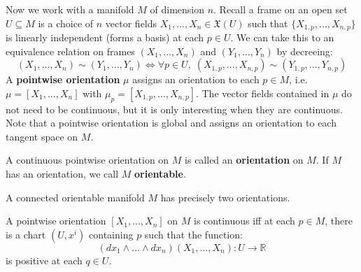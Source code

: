 Now we work with a manifold $M$ of dimension $n$. Recall a frame on an open set $U\subseteq M$ is a choice of $n$
vector fields $X_1, ..., X_n\in\mathfrak X(U)$ such that $\{X_{1, p}, ..., X_{n, p}\}$ is linearly independent (forms a basis) 
at each $p\in U$. We can take this to an equivalence relation on frames $(X_1, ..., X_n)$ and $(Y_1, ..., Y_n)$ by decreeing:
\begin{equation}
	(X_1, ..., X_n)\sim (Y_1, ..., Y_n)\iff \forall p\in U, \;(X_{1, p}, ..., X_{n, p})\sim (Y_{1, p}, ..., Y_{n, p})
\end{equation}
A \textbf{pointwise orientation} $\mu$ assigns an orientation to each $p\in M$, i.e. $\mu = [X_1, ..., X_n]$ with $\mu_p = 
[X_{1, p}, ..., X_{n, p}]$. The vector fields contained in $\mu$ do not need to be continuous, but it is only interesting when 
they are continuous. Note that a pointwise orientation is global and assigns an orientation to each tangent space on $M$. 
\begin{definition}
	A continuous pointwise orientation on $M$ is called an \textbf{orientation} on $M$. If $M$ has an orientation, we call 
	$M$ \textbf{orientable}. 
\end{definition}
\begin{theorem}
	A connected orientable manifold $M$ has precisely two orientations. 
\end{theorem}
\begin{theorem}
	A pointwise orientation $[X_1, ..., X_n]$ on $M$ is continuous iff at each $p\in M$, there is a chart $(U, x^i)$ containing 
	$p$ such that the function:
	\begin{equation}
		(dx_1\wedge ...\wedge dx_n)(X_1, ..., X_n) : U\rightarrow\mathbb R
	\end{equation}
	is positive at each $q\in U$. 
\end{theorem}

